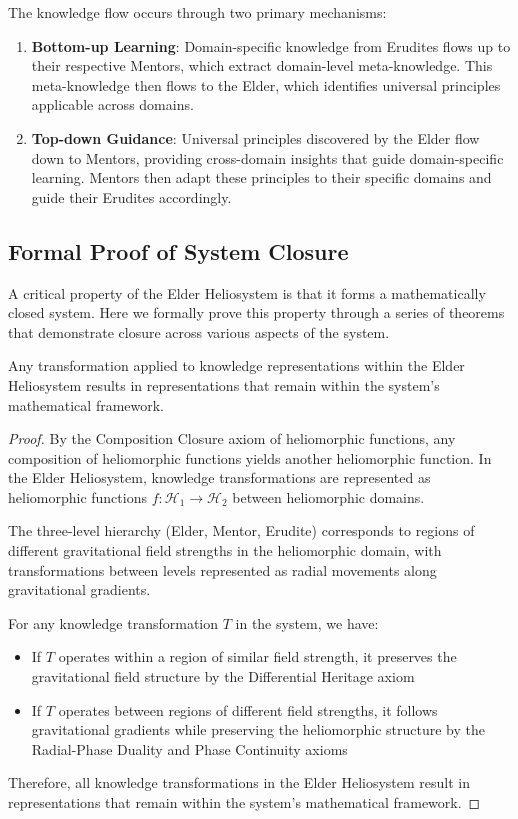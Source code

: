 The knowledge flow occurs through two primary mechanisms:

\begin{enumerate}
    \item \textbf{Bottom-up Learning}: Domain-specific knowledge from Erudites flows up to their respective Mentors, which extract domain-level meta-knowledge. This meta-knowledge then flows to the Elder, which identifies universal principles applicable across domains.
    
    \item \textbf{Top-down Guidance}: Universal principles discovered by the Elder flow down to Mentors, providing cross-domain insights that guide domain-specific learning. Mentors then adapt these principles to their specific domains and guide their Erudites accordingly.
\end{enumerate}

\subsection{Formal Proof of System Closure}

A critical property of the Elder Heliosystem is that it forms a mathematically closed system. Here we formally prove this property through a series of theorems that demonstrate closure across various aspects of the system.

\begin{theorem}
Any transformation applied to knowledge representations within the Elder Heliosystem results in representations that remain within the system's mathematical framework.
\end{theorem}

\begin{proof}
By the Composition Closure axiom of heliomorphic functions, any composition of heliomorphic functions yields another heliomorphic function. In the Elder Heliosystem, knowledge transformations are represented as heliomorphic functions $f: \mathcal{H}_1 \rightarrow \mathcal{H}_2$ between heliomorphic domains.

The three-level hierarchy (Elder, Mentor, Erudite) corresponds to regions of different gravitational field strengths in the heliomorphic domain, with transformations between levels represented as radial movements along gravitational gradients.

For any knowledge transformation $T$ in the system, we have:
\begin{itemize}
    \item If $T$ operates within a region of similar field strength, it preserves the gravitational field structure by the Differential Heritage axiom
    \item If $T$ operates between regions of different field strengths, it follows gravitational gradients while preserving the heliomorphic structure by the Radial-Phase Duality and Phase Continuity axioms
\end{itemize}

Therefore, all knowledge transformations in the Elder Heliosystem result in representations that remain within the system's mathematical framework.
\end{proof}

